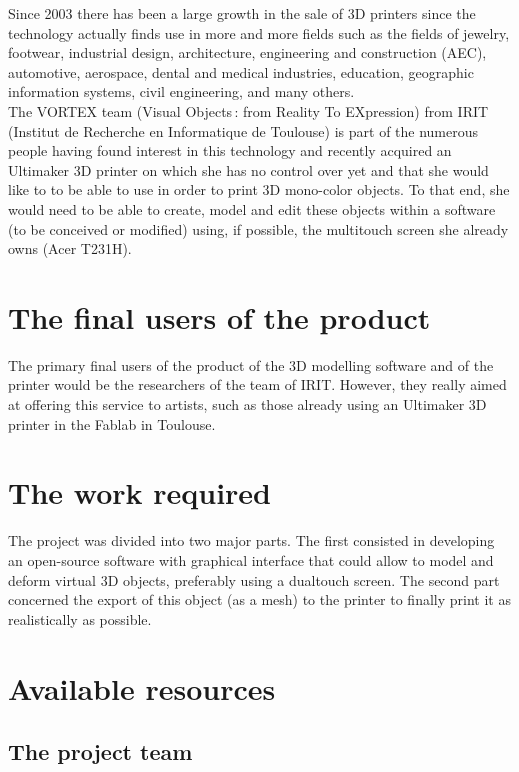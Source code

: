 \documentclass{report}
\begin{document}
Since 2003 there has been a large growth in the sale of 3D printers since the technology actually finds use in more and more fields such as the fields of jewelry, footwear, industrial design, architecture, engineering and construction (AEC), automotive, aerospace, dental and medical industries, education, geographic information systems, civil engineering, and many others.\\

The VORTEX team (Visual Objects : from Reality To EXpression) from IRIT (Institut de Recherche en Informatique de Toulouse) is part of the numerous people having found interest in this technology and recently acquired an Ultimaker 3D printer on which she has no control over yet and that she would like to to be able to use in order to print 3D mono-color objects. To that end, she would need to be able to create, model and edit these objects within a software (to be conceived or modified) using, if possible, the multitouch screen she already owns (Acer T231H).\\

\section{The final users of the product}

The primary final users of the product of the 3D modelling software and of the printer would be the researchers of the team of IRIT. However, they really aimed at offering this service to artists, such as those already using an Ultimaker 3D printer in the Fablab in Toulouse.

\section{The work required}

The project was divided into two major parts. The first consisted in developing an open-source software with graphical interface that could allow to model and deform virtual 3D objects, preferably using a dualtouch screen. The second part concerned the export of this object (as a mesh) to the printer to finally print it as realistically as possible.

\section{Available resources}

\subsection{The project team}
\end{document}
